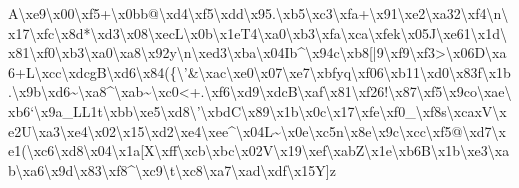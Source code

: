 \documentclass[11pt]{article}
\begin{document}
A\textbackslash{}xe9\textbackslash{}x00\textbackslash{}xf5+\textbackslash{}x0bb@\textbackslash{}xd4\textbackslash{}xf5\textbackslash{}xdd\textbackslash{}x95.\textbackslash{}xb5\textbackslash{}xc3\textbackslash{}xfa+\textbackslash{}x91\textbackslash{}xe2\textbackslash{}xa32\textbackslash{}xf4\textbackslash{}n\textbackslash{}x17\textbackslash{}xfc\textbackslash{}x8d*\textbackslash{}xd3\textbackslash{}x08\textbackslash{}xecL\textbackslash{}x0b\textbackslash{}x1eT4\textbackslash{}xa0\textbackslash{}xb3\textbackslash{}xfa\textbackslash{}xca\textbackslash{}xfek\textbackslash{}x05J\textbackslash{}xe61\textbackslash{}x1d\textbackslash{}x81\textbackslash{}xf0\textbackslash{}xb3\textbackslash{}xa0\textbackslash{}xa8\textbackslash{}x92y\textbackslash{}n\textbackslash{}xed3\textbackslash{}xba\textbackslash{}x04Ib\^{}\textbackslash{}x94c\textbackslash{}xb8[|9\textbackslash{}xf9\textbackslash{}xf3>\textbackslash{}x06D\textbackslash{}xa6+L\textbackslash{}xcc\textbackslash{}xdcgB\textbackslash{}xd6\textbackslash{}x84(\{\textbackslash{}'\&\textbackslash{}xac\textbackslash{}xe0\textbackslash{}x07\textbackslash{}xe7\textbackslash{}xbfyq\textbackslash{}xf06\textbackslash{}xb11\textbackslash{}xd0\textbackslash{}x83f\textbackslash{}x1b.\textbackslash{}x9b\textbackslash{}xd6\textasciitilde{}\textbackslash{}xa8\^{}\textbackslash{}xab\textasciitilde{}\textbackslash{}xc0<+.\textbackslash{}xf6\textbackslash{}xd9\textbackslash{}xdcB\textbackslash{}xaf\textbackslash{}x81\textbackslash{}xf26!\textbackslash{}x87\textbackslash{}xf5\textbackslash{}x9co\textbackslash{}xae\textbackslash{}xb6`\textbackslash{}x9a\_LL1t\textbackslash{}xbb\textbackslash{}xe5\textbackslash{}xd8\textbackslash{}'\textbackslash{}xbdC\textbackslash{}x89\textbackslash{}x1b\textbackslash{}x0c\textbackslash{}x17\textbackslash{}xfe\textbackslash{}xf0\_\textbackslash{}xf8s\textbackslash{}xcaxV\textbackslash{}xe2U\textbackslash{}xa3\textbackslash{}xe4\textbackslash{}x02\textbackslash{}x15\textbackslash{}xd2\textbackslash{}xe4\textbackslash{}xee\^{}\textbackslash{}x04L\textasciitilde{}\textbackslash{}x0e\textbackslash{}xc5n\textbackslash{}x8e\textbackslash{}x9c\textbackslash{}xcc\textbackslash{}xf5@\textbackslash{}xd7\textbackslash{}xe1(\textbackslash{}xc6\textbackslash{}xd8\textbackslash{}x04\textbackslash{}x1a[X\textbackslash{}xff\textbackslash{}xcb\textbackslash{}xbc\textbackslash{}x02V\textbackslash{}x19\textbackslash{}xef\textbackslash{}xabZ\textbackslash{}x1e\textbackslash{}xb6B\textbackslash{}x1b\textbackslash{}xe3\textbackslash{}xab\textbackslash{}xa6\textbackslash{}x9d\textbackslash{}x83\textbackslash{}xf8\^{}\textbackslash{}xc9\textbackslash{}t\textbackslash{}xc8\textbackslash{}xa7\textbackslash{}xad\textbackslash{}xdf\textbackslash{}x15Y]z 
\end{document}
